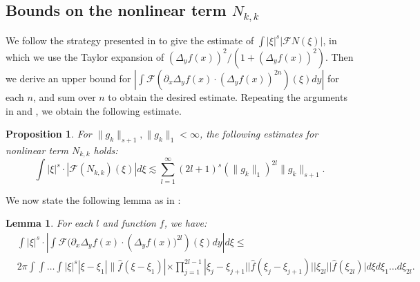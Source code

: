 \documentclass[11pt]{article}
\newtheorem{proposition}{Proposition}[section]
\newtheorem{lemma}{Lemma}[section]
\theoremstyle{definition}
\numberwithin{equation}{section}
\begin{document}
\subsection{Bounds on the nonlinear term $N_{k,k}$}
We follow the strategy presented in \cite{CCGS13} to give the estimate of $\int|\xi|^s\left|\mathscr{F}N(\xi)\right|$, in which we use the Taylor expansion of $(\Delta_yf(x))^2/\left(1+(\Delta_yf(x))^2\right)$. Then we derive an upper bound for $\left|\int\mathscr{F}(\partial_x\Delta_yf(x)\cdot(\Delta_yf(x))^{2n})(\xi)dy\right|$ for each $n$, and sum over \(n\) to obtain the desired estimate. Repeating the arguments in \cite{Patel03062017} and \cite{CCGS13}, we obtain the following estimate.
\begin{proposition}\label{prop estimate N1}
For $\|g_k\|_{s+1},\|g_k\|_1<\infty$, the following estimates for nonlinear term $N_{k,k}$ holds:
\begin{equation}\label{ineq_prop_estimate_N1}
    \int|\xi|^s\cdot|\mathscr{F}(N_{k,k})(\xi)|d\xi\lesssim \sum\limits_{l=1}^{\infty}(2l+1)^s\left(\|g_k\|_1\right)^{2l}\|g_k\|_{s+1}.
\end{equation}
\end{proposition}
We now state the following lemma as in \cite{CCGS13}:
\begin{lemma}\label{prop_estimate_N1_lemma}
    For each $l$ and function $f$, we have:
    \begin{equation*}
    \begin{aligned}
        &\int|\xi|^s\cdot\left|\int \mathscr{F}(\partial_x\Delta_yf(x)\cdot\left(\Delta_yf(x))^{2l}\right)
        (\xi)dy\right|d\xi\leq\\
        &2\pi\int\int\dots\int|\xi|^s|\xi-\xi_1|\|\hat{f}(\xi-\xi_1)|\times\prod_{j=1}^{2l-1}|\xi_j-\xi_{j+1}||\hat{f}(\xi_j-\xi_{j+1})||\xi_{2l}||\hat{f}(\xi_{2l})|d\xi d\xi_1\dots d\xi_{2l}.
    \end{aligned}
    \end{equation*}
\end{lemma}
\end{document}
